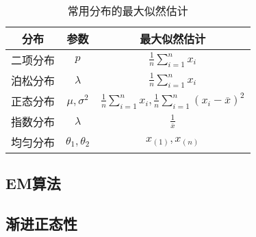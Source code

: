 \begin{table}[H]
    \centering
    \caption{常用分布的最大似然估计}
    \begin{tabular}{c|c|c}
        \toprule
        分布   & 参数                  & 最大似然估计                                                                                   \\
        \midrule
        二项分布 & $p$                 & $\frac{1}{n}\sum\limits_{i=1}^n x_i$                                                     \\
        泊松分布 & $\lambda$           & $\frac{1}{n}\sum\limits_{i=1}^n x_i$                                                     \\
        正态分布 & $\mu,\sigma^2$      & $\frac{1}{n}\sum\limits_{i=1}^n x_i,\frac{1}{n}\sum\limits_{i=1}^n (x_i-\overline{x})^2$ \\
        指数分布 & $\lambda$           & $\frac{1}{\overline{x}}$                                                                 \\
        均匀分布 & $\theta_1,\theta_2$ & $x_{(1)},x_{(n)}$                                                                        \\

        \bottomrule
    \end{tabular}


\end{table}


\subsection{EM算法}
\subsection{渐进正态性}

